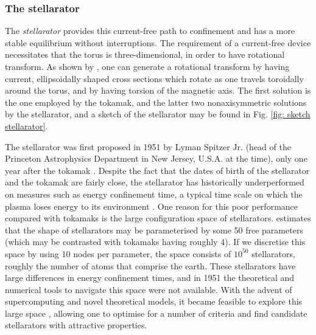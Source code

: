\subsubsection{The stellarator}
The \textit{stellarator} provides this current-free path to confinement and has a more stable equilibrium without interruptions. The requirement of a current-free device necessitates that the torus is three-dimensional, in order to have rotational transform. As shown by \citet{mercier1964equilibrium}, one can generate a rotational transform by having current, ellipsoidally shaped cross sections which rotate as one travels toroidally around the torus, and by having torsion of the magnetic axis. The first solution is the one employed by the tokamak, and the latter two nonaxisymmetric solutions by the stellarator, and a sketch of the stellarator may be found in Fig. \ref{fig: sketch stellarator}. \par

The stellarator was first proposed in 1951 by Lyman Spitzer Jr. (head of the Princeton Astrophysics Department in New Jersey, U.S.A. at the time), only one year after the tokamak \cite{spitzer1951project}. Despite the fact that the dates of birth of the stellarator and the tokamak are fairly close, the stellarator has historically underperformed on measures such as energy confinement time, a typical time scale on which the plasma loses energy to its environment \cite{sudo1990scalings,stroth1996energy,sunn2017key}. One reason for this poor performance compared with tokamaks is the large configuration space of stellarators. \citet{boozer2005physics} estimates that the shape of stellarators may be parameterised by some 50 free parameters (which may be contrasted with tokamaks having roughly 4). If we discretise this space by using 10 nodes per parameter, the space consists of $10^{50}$ stellarators, roughly the number of atoms that comprise the earth. These stellarators have large differences in energy confinement times, and in 1951 the theoretical and numerical tools to navigate this space were not available. With the advent of supercomputing and novel theoretical models, it became feasible to explore this large space \cite{catto1981omnigenous,boozer1983transport,beidler1990physics,grieger1992physics,grieger1992modular,nuhrenberg1995overview}, allowing one to optimise for a number of criteria and find candidate stellarators with attractive properties. \par

